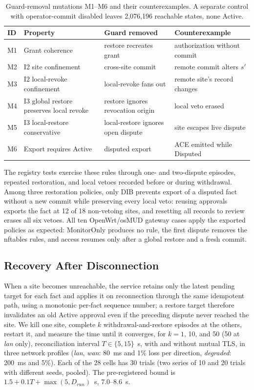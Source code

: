 \documentclass[journal]{IEEEtran}
\theoremstyle{definition}
\begin{document}
\begin{table}[t]
\centering
\caption{Guard-removal mutations M1--M6 and their counterexamples. A separate control with operator-commit disabled leaves 2,076,196 reachable states, none Active.}
\label{tab:tla}
\scriptsize
\begin{tabular}{@{}p{0.35cm}p{2.05cm}p{1.85cm}p{1.95cm}@{}}
\toprule
ID & Property & Guard removed & Counterexample \\
\midrule
M1 & Grant coherence & restore recreates grant & authorization without commit \\
M2 & I2 site confinement & cross-site commit & remote commit alters $s'$ \\
M3 & I2 local-revoke confinement & local-revoke fans out & remote site's record changes \\
M4 & I3 global restore preserves local revoke & restore ignores revocation origin & local veto erased \\
M5 & I3 local-restore conservative & local-restore ignores open dispute & site escapes live dispute \\
M6 & Export requires Active & disputed export & ACE emitted while Disputed \\
\bottomrule
\end{tabular}
\end{table}

The registry tests exercise these rules through one- and two-dispute episodes, repeated restoration, and local vetoes recorded before or during withdrawal. Among three restoration policies, only DIB prevents export of a disputed fact without a new commit while preserving every local veto: reusing approvals exports the fact at 12 of 18 non-vetoing sites, and resetting all records to review erases all six vetoes. All ten OpenWrt/osMUD gateway cases apply the exported policies as expected: MonitorOnly produces no rule, the first dispute removes the nftables rules, and access resumes only after a global restore and a fresh commit.

\subsection{Recovery After Disconnection}
\label{sec:scalability-results}
When a site becomes unreachable, the service retains only the latest pending target for each fact and applies it on reconnection through the same idempotent path, using a monotonic per-fact sequence number; a restore target therefore invalidates an old Active approval even if the preceding dispute never reached the site. We kill one site, complete $k$ withdrawal-and-restore episodes at the others, restart it, and measure the time until it converges, for $k=1$, 10, and 50 (50 at \emph{lan} only), reconciliation interval $T\in\{5,15\}$~s, with and without mutual TLS, in three network profiles (\emph{lan}, \emph{wan}: 80~ms and 1\% loss per direction, \emph{degraded}: 200~ms and 5\%). Each of the 28 cells has 30 trials (two series of 10 and 20 trials with different seeds, pooled). The pre-registered bound is $1.5+0.1T+\max(5,D_{run})$~s, 7.0--8.6~s.
\end{document}
